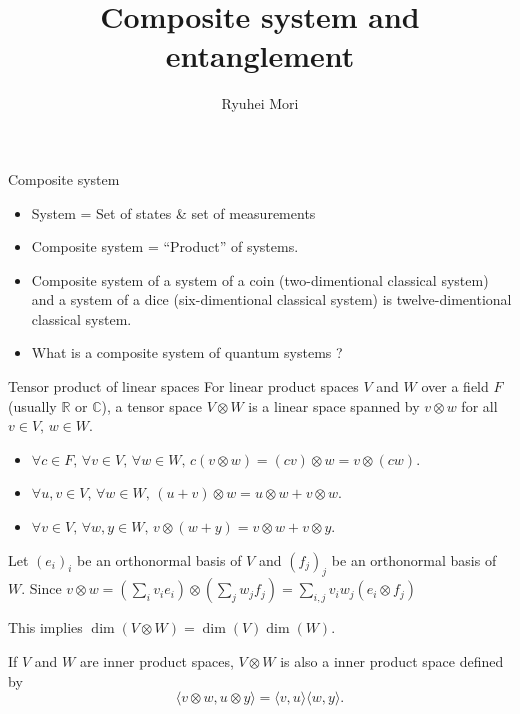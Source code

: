 \documentclass[10pt]{beamer}
\title{Composite system and entanglement}
\author{Ryuhei Mori}
\institute{Tokyo Institute of Technology}
\date{}
\newcommand\emm[1]{\textcolor{redorange}{{#1}}}
\begin{document}
\begin{frame}[plain]
\maketitle
\end{frame}


\begin{frame}{Composite system}
\begin{itemize}
\setlength{\itemsep}{2em}
\item System = Set of states \& set of measurements
\item \emm{Composite} system = ``Product'' of systems.
\item \emm{Composite} system of a system of a coin (two-dimentional classical system) and a system of a dice (six-dimentional classical system) is twelve-dimentional classical system.
\item What is a \emm{composite} system of quantum systems ?
\end{itemize}
\end{frame}

\begin{frame}{Tensor product of linear spaces}
For linear product spaces $V$ and $W$ over a field $F$ (usually $\mathbb{R}$ or $\mathbb{C}$),
a tensor space $V\otimes W$ is a linear space spanned by $v\otimes w$ for all $v\in V,\, w\in W$.

\vspace{1em}
\begin{itemize}
\setlength{\itemsep}{2em}
\item $\forall c\in F,\,\forall v\in V,\, \forall w\in W,\, c(v\otimes w) = (cv)\otimes w = v\otimes (cw) $.
\item $\forall u,v\in V,\, \forall w\in W,\, (u+v)\otimes w = u\otimes w + v\otimes w $.
\item $\forall v\in V,\, \forall w,y\in W,\, v\otimes (w+y) = v\otimes w + v\otimes y $.
\end{itemize}

\vspace{1em}
Let $(e_i)_i$ be an orthonormal basis of $V$ and $(f_j)_j$ be an orthonormal basis of $W$.
Since $v\otimes w = (\sum_i v_i e_i)\otimes(\sum_j w_j f_j) = \sum_{i,j} v_i w_j (e_i\otimes f_j)$

This implies \emm{$\dim(V\otimes W) =\dim(V)\dim(W)$}.

\vspace{1em}
If $V$ and $W$ are inner product spaces, $V\otimes W$ is also a inner product space defined by
\begin{equation*}
\langle v\otimes w, u\otimes y\rangle =
\langle v, u\rangle\langle w, y\rangle.
\end{equation*}
\end{frame}
\end{document}
